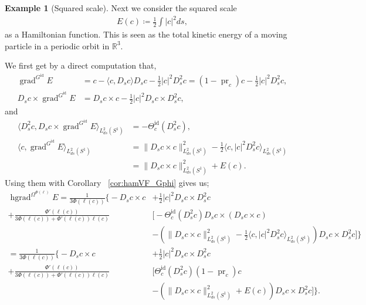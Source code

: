 \documentclass[12pt]{amsart}
\newcommand{\rev}[1]{#1}
\theoremstyle{definition}
\newtheorem{example}[theorem]{Example}
\newcommand{\R}{\mathbb R}
\newcommand{\id}{\mathrm{id}}
\def\Th{\Theta}
\def\Ph{\Phi}
\def\Om{\Omega}
\def\x{\times}
\def\R{{\mathbb R}}
\let\on=\operatorname
\begin{document}
\begin{example}[Squared scale]\label{eg:squaredScale}
Next we consider the squared scale
\begin{align}\label{eq:squared_scale}
    E(c)\coloneqq \frac12 \int |c|^2 ds, 
\end{align}
as a Hamiltonian function. This is seen as the total kinetic energy of a moving particle in a periodic orbit in $\R^3$.

We first get by a direct computation that,
\begin{align}
    \on{grad}^{G^\id}E&=c - \langle c,D_s c\rangle D_s c -  \frac{1}{2}|c|^2 D_s^2 c=(1-\on{pr}_c)c  -  \frac{1}{2}|c|^2 D_s^2 c,\\
    D_s c\x \on{grad}^{G^\id}E&=D_s c \x c -  \frac{1}{2}|c|^2 D_s c \x D_s^2 c,
\end{align}
and
\begin{align}
    \langle D_s^2 c, D_s c\x \on{grad}^{G^\id} E\rangle_{L^2_{ds}(S^1)}&= -\Th^\id_c(D_s^2 c),\\
      \langle  c, \on{grad}^{G^\id} E\rangle_{L^2_{ds}(S^1)}
     &= \| D_s c \x c\|_{L^2_{ds}(S^1)}^2 -\frac{1}{2}\langle c, |c|^2 D_s^2 c\rangle _{L^2_{ds}(S^1)}
     \\&=\| D_s c \x c\|_{L^2_{ds}(S^1)}^2 +E(c).
\end{align}
Using them with Corollary ~\ref{cor:hamVF_Gphi} gives us;
   \begin{align}\label{eq:hgrad_squaredScale}
         \on{hgrad}^{\Om^{\Phi(\ell)}} E
        = \frac{1}{3\Phi(\rev{\ell(c)})} \Big\{ - D_s c \times c &+ \frac{1}{2}|c|^2 D_s c \x D_s^2 c\\ 
        +\frac{\Phi'(\rev{\ell(c)})}{3\Phi(\rev{\ell(c)})+\Ph'(\rev{\ell(c)})\rev{\ell(c)}} &\Big[ -\Th^\id_c(D_s^2 c) D_s c\times (D_s c \x c)\\ 
        &-  \left(\|D_s c \x c\|^2 _{L^2_{ds}(S^1)}-\frac{1}{2}\langle c,|c|^2 D_s^2 c\rangle _{L^2_{ds}(S^1)} \right)  D_s c\times D_s^2 c\Big]\Big\}\\
        = \frac{1}{3\Phi(\rev{\ell(c)})} \Big\{ - D_s c \times c &+ \frac{1}{2}|c|^2 D_s c \x D_s^2 c\\ 
        +\frac{\Phi'(\rev{\ell(c)})}{3\Phi(\rev{\ell(c)})+\Ph'(\rev{\ell(c)})\rev{\ell(c)}} &\Big[ \Th^\id_c(D_s^2 c) (1-\on{pr}_c)c\\ 
        & -\left(\|D_s c \x c\|^2 _{L^2_{ds}(S^1)}+E(c) \right)  D_s c\times D_s^2 c\Big]\Big\}.
    \end{align}
    

\end{example}
\end{document}
